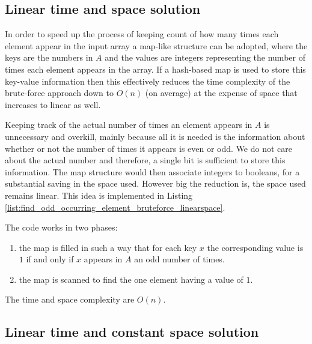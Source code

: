 \subsection{Linear time and space solution}
\label{find_odd_occurring_element:sec:map}

In order to speed up the process of keeping count of how many times each element appear in the input array a map-like structure can be adopted, where the keys are the numbers in $A$ and the values are integers representing the number of times each element appears in the array.
If a hash-based map is used to store this key-value information then this effectively reduces the time complexity of the brute-force approach down to $O(n)$ (on average) at the expense of space that increases to linear as well.

Keeping track of the actual number of times an element appears in $A$ is unnecessary and overkill, mainly because all it is needed is the information about whether or not the number of times it appears is even or odd. We do not care about the actual number and therefore, a single bit is sufficient to store this information. The map structure would then associate integers to booleans, for a substantial saving in the space used. However big the reduction is, the space used remains linear. 
This idea is implemented in Listing \ref{list:find_odd_occurring_element_bruteforce_linearspace}.




The code works in two phases:
\begin{enumerate}
	\item the map  is filled in such a way that for each key $x$ the corresponding value is $1$ if and only if $x$ appears in $A$ an odd number of times.
	\item the map is scanned to find the one element having a value of $1$.
\end{enumerate}
The time and space complexity are $O(n)$.

\subsection{Linear time and constant space solution}
\label{find_odd_occurring_element:sec:constant_space}

